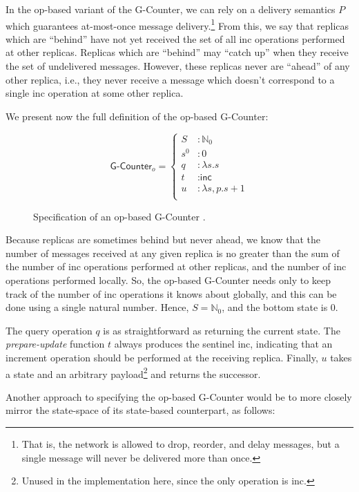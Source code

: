In the op-based variant of the G-Counter, we can
rely on a delivery semantics $P$ which guarantees at-most-once message
delivery.\footnote{That is, the network is allowed to drop, reorder, and delay
messages, but a single message will never be delivered more than once.} From
this, we say that replicas which are ``behind'' have not yet received the set of
all \textsf{inc} operations performed at other replicas. Replicas which are
``behind'' may ``catch up'' when they receive the set of undelivered messages.
However, these replicas never are ``ahead'' of any other replica, i.e., they
never receive a message which doesn't correspond to a single \textsf{inc}
operation at some other replica.

We present now the full definition of the op-based G-Counter:

\begin{figure}[H]
  \centering
  \[
    \textsf{G-Counter}_o = \left\{\begin{aligned}
      S &: \mathbb{N}_0 \\
      s^0 &: 0 \\
      q &: \lambda s. s \\
      t &: \textsf{inc} \\
      u &: \lambda s,p. s + 1 \\
    \end{aligned}\right.
  \]
  \caption{Specification of an op-based \textsf{G-Counter} \CRDT.}
\end{figure}

Because replicas are sometimes behind but never ahead, we know that the number
of messages received at any given replica is no greater than the sum of the
number of \textsf{inc} operations performed at other replicas, and the number of
\textsf{inc} operations performed locally. So, the op-based G-Counter needs only
to keep track of the number of \textsf{inc} operations it knows about globally,
and this can be done using a single natural number. Hence, $S = \mathbb{N}_0$,
and the bottom state is $0$.

The query operation $q$ is as straightforward as returning the current state.
The \emph{prepare-update} function $t$ always produces the sentinel
\textsf{inc}, indicating that an increment operation should be performed at the
receiving replica. Finally, $u$ takes a state and an arbitrary
payload\footnote{Unused in the implementation here, since the only operation is
\textsf{inc}.} and returns the successor.

Another approach to specifying the op-based G-Counter \CRDT would be to more
closely mirror the state-space of its state-based counterpart, as follows:

